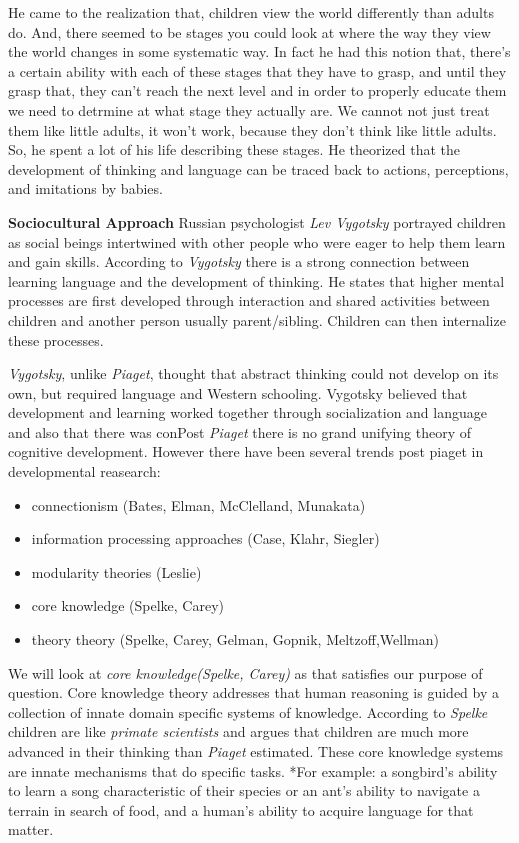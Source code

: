 \documentclass[11pt]{article}
\providecommand{\tightlist}{%
      \setlength{\itemsep}{0pt}\setlength{\parskip}{0pt}}
\begin{document}
He came to the realization that, children view the world differently
than adults do. And, there seemed to be stages you could look at where
the way they view the world changes in some systematic way. In fact he
had this notion that, there's a certain ability with each of these
stages that they have to grasp, and until they grasp that, they can't
reach the next level and in order to properly educate them we need to
detrmine at what stage they actually are. We cannot not just treat them
like little adults, it won't work, because they don't think like little
adults. So, he spent a lot of his life describing these stages. He
theorized that the development of thinking and language can be traced
back to actions, perceptions, and imitations by babies.

    \textbf{Sociocultural Approach} Russian psychologist \emph{Lev Vygotsky}
portrayed children as social beings intertwined with other people who
were eager to help them learn and gain skills. According to
\emph{Vygotsky} there is a strong connection between learning language
and the development of thinking. He states that higher mental processes
are first developed through interaction and shared activities between
children and another person usually parent/sibling. Children can then
internalize these processes.

\emph{Vygotsky}, unlike \emph{Piaget}, thought that abstract thinking
could not develop on its own, but required language and Western
schooling. Vygotsky believed that development and learning worked
together through socialization and language and also that there was
conPost \emph{Piaget} there is no grand unifying theory of cognitive
development. However there have been several trends post piaget in
developmental reasearch:

\begin{itemize}
\tightlist
\item
  connectionism (Bates, Elman, McClelland, Munakata)
\item
  information processing approaches (Case, Klahr, Siegler)
\item
  modularity theories (Leslie)
\item
  core knowledge (Spelke, Carey)
\item
  theory theory (Spelke, Carey, Gelman, Gopnik, Meltzoff,Wellman)
\end{itemize}

We will look at \emph{core knowledge(Spelke, Carey)} as that satisfies
our purpose of question. Core knowledge theory addresses that human
reasoning is guided by a collection of innate domain specific systems of
knowledge. According to \emph{Spelke} children are like \emph{primate
scientists} and argues that children are much more advanced in their
thinking than \emph{Piaget} estimated. These core knowledge systems are
innate mechanisms that do specific tasks. *For example: a songbird's
ability to learn a song characteristic of their species or an ant's
ability to navigate a terrain in search of food, and a human's ability
to acquire language for that matter.
\end{document}
